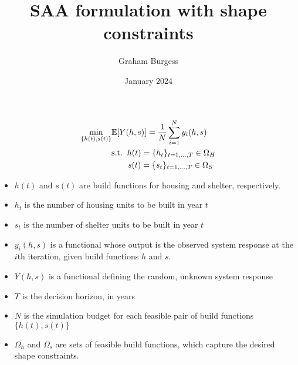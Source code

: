 \documentclass{article}
\title{SAA formulation with shape constraints}
\author{Graham Burgess}
\date{January 2024}
\begin{document}
\maketitle

\begin{align*}
  \min_{\{h(t), s(t)\}} & \mathbb{E} [Y(h,s)] = \frac{1}{N}\sum_{i=1}^{N}y_{i}(h,s) \\
  & \text{s.t.} \hspace{0.2cm} h(t) = \{h_{t}\}_{t=1, ..., T} \in \Omega_{H} \\
  & \hspace{0.7cm} s(t) = \{s_{t}\}_{t=1, ..., T} \in \Omega_{S} \\
\end{align*}

\begin{itemize}
  \item $h(t)$ and $s(t)$ are build functions for housing and shelter, respectively. 
  \item $h_t$ is the number of housing units to be built in year $t$ 
  \item $s_t$ is the number of shelter units to be built in year $t$
  \item $y_i(h,s)$ is a functional whose output is the observed system response at the $i$th iteration, given build functions $h$ and $s$.     
  \item $Y(h,s)$ is a functional defining the random, unknown system response
  \item $T$ is the decision horizon, in years 
  \item $N$ is the simulation budget for each feasible pair of build functions $\{h(t),s(t)\}$
  \item $\Omega_h$ and $\Omega_s$ are sets of feasible build functions, which capture the desired shape constraints. 
\end{itemize}
    
\end{document}

